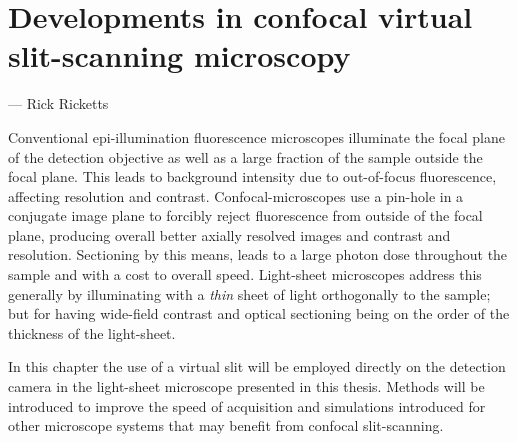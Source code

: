 \ifpdf
    \graphicspath{{Chapters/dualslit/Figs/Raster/}{Chapters/dualslit/Figs/PDF/}{Chapters/dualslit/Figs/}}
\else
    \graphicspath{{Chapters/dualslit/Figs/Vector/}{Chapters/dualslit/Figs/}}
\fi

\chapter{Developments in confocal virtual \gls{slit-scanning} microscopy}\label{chapter:dualslit}

\epigraph{\emph{}}{--- Rick Ricketts}


Conventional epi-illumination fluorescence microscopes illuminate the focal plane of the detection objective as well as a large fraction of the sample outside the focal plane.
This leads to background intensity due to out-of-focus fluorescence, affecting resolution and contrast.
Confocal-microscopes use a pin-hole in a conjugate image plane to forcibly reject fluorescence from outside of the focal plane, producing overall better axially resolved images and contrast and resolution.
Sectioning by this means, leads to a large photon dose throughout the sample and with a cost to overall speed.
Light-sheet microscopes address this generally by illuminating with a \emph{thin} sheet of light orthogonally to the sample; but for having wide-field contrast and optical sectioning being on the order of the thickness of the light-sheet.

In this chapter the use of a virtual slit will be employed directly on the detection camera in the \gls{light-sheet} microscope presented in this thesis.
Methods will be introduced to improve the speed of acquisition and simulations introduced for other microscope systems that may benefit from confocal \gls{slit-scanning}.

